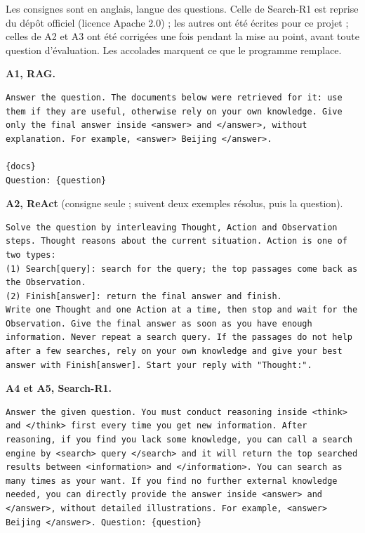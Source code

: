 \documentclass[11pt,a4paper]{article}
\begin{document}
Les consignes sont en anglais, langue des questions. Celle de Search-R1 est reprise du dépôt officiel (licence Apache 2.0) ; les autres ont été écrites pour ce projet ; celles de A2 et A3 ont été corrigées une fois pendant la mise au point, avant toute question d'évaluation. Les accolades marquent ce que le programme remplace.

\noindent\textbf{A1, RAG.}
\begin{Verbatim}[breaklines, fontsize=\footnotesize, frame=single]
Answer the question. The documents below were retrieved for it: use them if they are useful, otherwise rely on your own knowledge. Give only the final answer inside <answer> and </answer>, without explanation. For example, <answer> Beijing </answer>.

{docs}
Question: {question}
\end{Verbatim}

\noindent\textbf{A2, ReAct} (consigne seule ; suivent deux exemples résolus, puis la question).
\begin{Verbatim}[breaklines, fontsize=\footnotesize, frame=single]
Solve the question by interleaving Thought, Action and Observation steps. Thought reasons about the current situation. Action is one of two types:
(1) Search[query]: search for the query; the top passages come back as the Observation.
(2) Finish[answer]: return the final answer and finish.
Write one Thought and one Action at a time, then stop and wait for the Observation. Give the final answer as soon as you have enough information. Never repeat a search query. If the passages do not help after a few searches, rely on your own knowledge and give your best answer with Finish[answer]. Start your reply with "Thought:".
\end{Verbatim}

\noindent\textbf{A4 et A5, Search-R1.}
\begin{Verbatim}[breaklines, fontsize=\footnotesize, frame=single]
Answer the given question. You must conduct reasoning inside <think> and </think> first every time you get new information. After reasoning, if you find you lack some knowledge, you can call a search engine by <search> query </search> and it will return the top searched results between <information> and </information>. You can search as many times as your want. If you find no further external knowledge needed, you can directly provide the answer inside <answer> and </answer>, without detailed illustrations. For example, <answer> Beijing </answer>. Question: {question}
\end{Verbatim}
\end{document}
